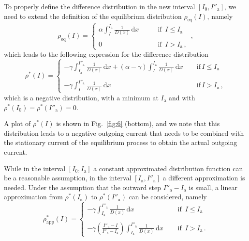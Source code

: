 {To properly define the difference distribution in the new interval $[I_0, I''_\mathrm{a}]$, we need to extend the definition of the equilibrium distribution $\rho_\text{eq}(I)$, namely
\begin{equation}
    \rho_\text{eq}(I) = 
    \left\{\begin{array}{lr}
        \alpha \displaystyle{\int_I^{I_\mathrm{a}} \frac{1}{D(x)}\,\mathrm{d}x} \qquad & \text{if } \, I \leq I_\mathrm{a} \\
        \\
        0 \qquad & \text{if } \, I > I_\mathrm{a}\,,
    \end{array}\right.\,,
\end{equation}
which leads to the following expression for the difference distribution  
\begin{equation}
    \rho^\ast(I) = 
    \left\{\begin{array}{lr}
        - \gamma \displaystyle{\int_{I_\mathrm{a}}^{I''_\mathrm{a}} \frac{1}{D(x)}\,\mathrm{d}x + (\alpha - \gamma) \int_{I}^{I_\mathrm{a}} \frac{1}{D(x)}\,\mathrm{d}x}\ \quad &\text{if} \, I \leq I_\mathrm{a}\\
        \\
        - \gamma \displaystyle{\int_{I}^{I''_\mathrm{a}} \frac{1}{D(x)}\,\mathrm{d}x} \quad &\text{if} \, I > I_\mathrm{a}\,,
    \end{array}\right. 
    \label{eq:outward_difference}
\end{equation}
which is a negative distribution, with a minimum at $I_\mathrm{a}$ and with $\rho^\ast(I_0) = \rho^\ast(I''_\mathrm{a}) = 0$.

A plot of $\rho^\ast(I)$ is shown in Fig.~\ref{fig:6} (bottom), and we note that this distribution leads to a negative outgoing current that needs to be combined with the stationary current of the equilibrium process to obtain the actual outgoing current.

While in the interval $[I_0, I_\mathrm{a}]$ a constant approximated distribution function can be a reasonable assumption, in the interval $[I_\mathrm{a}, I''_\mathrm{a}]$ a different approximation is needed. Under the assumption that the outward step $I''_\mathrm{a} - I_\mathrm{a}$ is small, a linear approximation from $\rho^\ast(I_\mathrm{a})$ to $\rho^\ast(I''_\mathrm{a})$ can be considered, namely
\begin{equation}
    \rho^\ast_\text{app}(I) = 
    \left\{\begin{array}{lr}
        - \gamma \displaystyle{\int_{I_\mathrm{a}}^{I''_\mathrm{a}} \frac{1}{D(x)}\,\mathrm{d}x} \quad &\text{  if } \, I \leq I_\mathrm{a}\\
        \\
        - \gamma \displaystyle{\left(\frac{I''_\mathrm{a} - I}{I''_\mathrm{a} - I_\mathrm{a}} \right)} \displaystyle{\int_{I_\mathrm{a}}^{I''_\mathrm{a}} \frac{1}{D(x)}\,\mathrm{d}x} \quad &\text{  if } \, I > I_\mathrm{a} \,.
    \end{array}\right. 
    \label{eq:outward_difference_approx}
\end{equation} 

}
